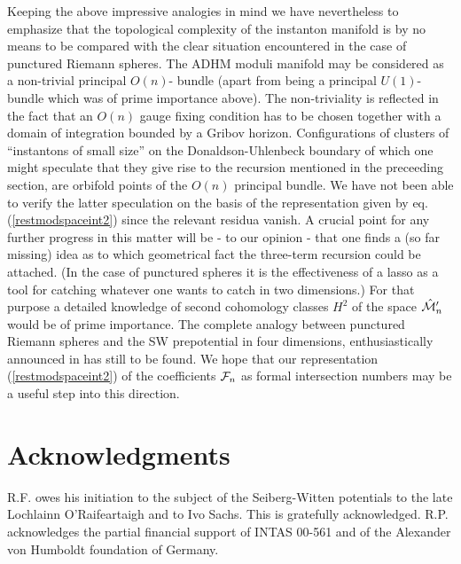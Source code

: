 \documentclass[a4paper,12pt]{article}
\begin{document}
Keeping the above impressive analogies in mind we have nevertheless 
to emphasize that the topological complexity of the instanton 
manifold is by no means to be compared with the clear situation 
encountered in the case of punctured Riemann spheres. The 
ADHM moduli manifold may be considered as a non-trivial 
principal $O(n)$- bundle  
(apart from being  a principal $U(1)$-bundle which was of prime 
importance above). The 
non-triviality is reflected in the fact that an $O(n)$ gauge 
fixing condition has to be chosen together with a domain of  
integration bounded by a Gribov horizon. Configurations of clusters 
of ``instantons of small size'' on the Donaldson-Uhlenbeck boundary 
of which one might speculate that they give rise to the recursion 
mentioned in the preceeding section, are orbifold points of the 
$O(n)$ principal bundle. We have not been able to verify the 
latter speculation on the basis of the representation given 
by eq. (\ref{restmodspaceint2}) since the relevant residua vanish. 
A crucial 
point for any further progress in this matter will be - to our 
opinion - that one finds a (so far missing) idea as to which geometrical 
fact the three-term recursion could be attached. (In the case 
of punctured spheres it is the effectiveness of a lasso as 
a tool for catching whatever one wants to catch in two dimensions.)
For that purpose a detailed knowledge of second cohomology classes 
$H^2$ of the space $\hat{{\cal M}}'_n$ would be of prime importance. 
The complete analogy between punctured Riemann spheres and 
the SW prepotential in four dimensions, enthusiastically announced 
in \cite{matone2} has still to be found. We hope that our 
representation (\ref{restmodspaceint2}) of the coefficients 
${\cal F}_n$ as formal 
intersection numbers may be a useful step into this direction.    



\section*{Acknowledgments}
R.F. owes his initiation to the subject of the Seiberg-Witten 
potentials to the late Lochlainn O'Raifeartaigh and to Ivo Sachs. 
This is gratefully  acknowledged.
R.P. acknowledges the partial financial support of INTAS 00-561 
and of the Alexander von Humboldt foundation of Germany.
\end{document}
